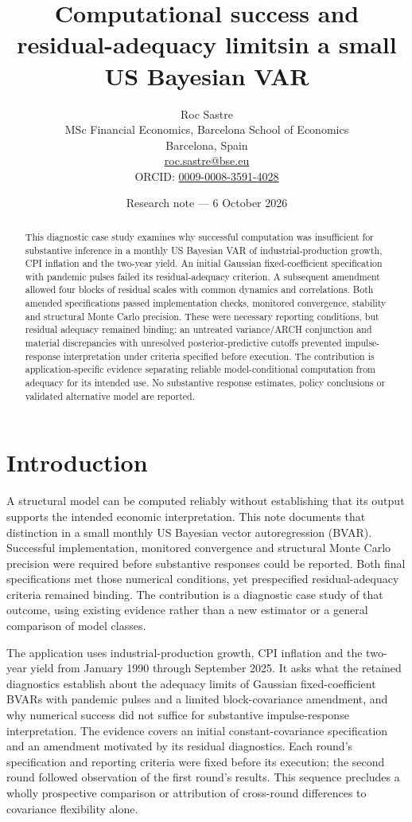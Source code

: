 \documentclass[11pt,a4paper]{article}
\title{Computational success and residual-adequacy limits\linebreak in a small US Bayesian VAR}
\author{\normalsize Roc Sastre\\
\small MSc Financial Economics, Barcelona School of Economics\\
\small Barcelona, Spain\\
\small\href{mailto:roc.sastre@bse.eu}{roc.sastre@bse.eu}\\
\small ORCID: \href{https://orcid.org/0009-0008-3591-4028}{0009-0008-3591-4028}}
\date{Research note --- 6 October 2026}
\begin{document}
\maketitle
\begin{abstract}
This diagnostic case study examines why successful computation was insufficient for substantive inference in a monthly US Bayesian VAR of industrial-production growth, CPI inflation and the two-year yield. An initial Gaussian fixed-coefficient specification with pandemic pulses failed its residual-adequacy criterion. A subsequent amendment allowed four blocks of residual scales with common dynamics and correlations. Both amended specifications passed implementation checks, monitored convergence, stability and structural Monte Carlo precision. These were necessary reporting conditions, but residual adequacy remained binding: an untreated variance/ARCH conjunction and material discrepancies with unresolved posterior-predictive cutoffs prevented impulse-response interpretation under criteria specified before execution. The contribution is application-specific evidence separating reliable model-conditional computation from adequacy for its intended use. No substantive response estimates, policy conclusions or validated alternative model are reported.
\end{abstract}

\section{Introduction}
A structural model can be computed reliably without establishing that its output supports the intended economic interpretation. This note documents that distinction in a small monthly US Bayesian vector autoregression (BVAR). Successful implementation, monitored convergence and structural Monte Carlo precision were required before substantive responses could be reported. Both final specifications met those numerical conditions, yet prespecified residual-adequacy criteria remained binding. The contribution is a diagnostic case study of that outcome, using existing evidence rather than a new estimator or a general comparison of model classes.

The application uses industrial-production growth, CPI inflation and the two-year yield from January 1990 through September 2025. It asks what the retained diagnostics establish about the adequacy limits of Gaussian fixed-coefficient BVARs with pandemic pulses and a limited block-covariance amendment, and why numerical success did not suffice for substantive impulse-response interpretation. The evidence covers an initial constant-covariance specification and an amendment motivated by its residual diagnostics. Each round's specification and reporting criteria were fixed before its execution; the second round followed observation of the first round's results. This sequence precludes a wholly prospective comparison or attribution of cross-round differences to covariance flexibility alone.
\end{document}
